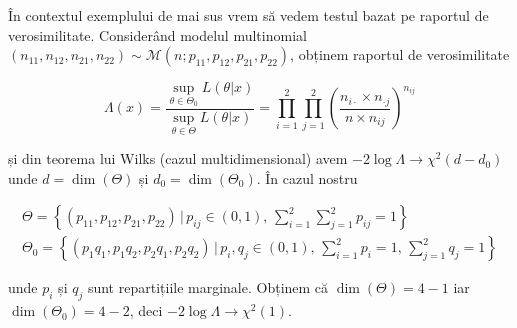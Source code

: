\documentclass[]{article}
\begin{document}
În contextul exemplului de mai sus vrem să vedem testul bazat pe
raportul de verosimilitate. Considerând modelul multinomial
\((n_{11},n_{12},n_{21},n_{22})\sim \mathcal{M}(n;p_{11},p_{12},p_{21},p_{22})\),
obținem raportul de verosimilitate

\[
  \Lambda(x)=\frac{\sup_{\theta\in\Theta_0}L(\theta|x)}{\sup_{\theta\in\Theta}L(\theta|x)}=\prod_{i=1}^{2}\prod_{j=1}^{2}\left(\frac{n_{i\cdot}\times n_{\cdot j}}{n\times n_{ij}}\right)^{n_{ij}}
\]

și din teorema lui Wilks (cazul multidimensional) avem
\(-2\log\Lambda\to\chi^2(d-d_0)\) unde \(d=\dim(\Theta)\) și
\(d_0=\dim(\Theta_0)\). În cazul nostru

\[
  \begin{array}{ll}
    \Theta = \left\{(p_{11},p_{12},p_{21},p_{22})\,|\,p_{ij}\in(0,1),\,\sum_{i=1}^{2}\sum_{j=1}^{2}p_{ij}=1\right\}\\
    \Theta_0 = \left\{(p_{1}q_1,p_{1}q_2,p_{2}q_1,p_{2}q_2)\,|\,p_{i},q_j\in(0,1),\,\sum_{i=1}^{2}p_{i}=1,\,\sum_{j=1}^{2}q_j=1\right\}
  \end{array}
\]

unde \(p_i\) și \(q_j\) sunt repartițiile marginale. Obținem că
\(\dim(\Theta)=4-1\) iar \(\dim(\Theta_0)=4-2\), deci
\(-2\log\Lambda\to\chi^2(1)\).
\end{document}
